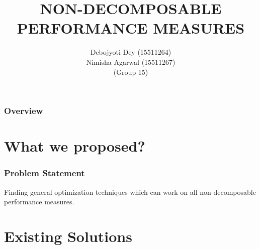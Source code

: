 \documentclass{beamer}
\title[Short title]{NON-DECOMPOSABLE PERFORMANCE MEASURES} %
\author{Debojyoti Dey (15511264)\\ Nimisha Agarwal (15511267)\\ (Group 15)} %
\begin{document}
	
	\begin{frame}
		\titlepage %
	\end{frame}
	
	\begin{frame}
		\frametitle{Overview} %
		\tableofcontents %
	\end{frame}


\section{What we proposed?} %

\begin{frame}
	\frametitle{Problem Statement}
	Finding general optimization techniques which can work on all non-decomposable performance measures.
\end{frame}


\section{Existing Solutions} %
\end{document}
